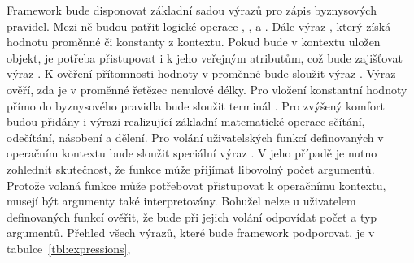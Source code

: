 Framework bude disponovat základní sadou výrazů pro zápis byznysových pravidel.
Mezi ně budou patřit logické operace , ,  a .
Dále výraz , který získá hodnotu proměnné či konstanty z kontextu.
Pokud bude v kontextu uložen objekt, je potřeba přistupovat i k jeho
veřejným atributům, což bude zajišťovat výraz .
K ověření přítomnosti hodnoty v proměnné bude sloužit výraz . Výraz  ověří,
zda je v proměnné řetězec nenulové délky. Pro vložení konstantní hodnoty přímo do byznysového pravidla bude
sloužit terminál . Pro zvýšený komfort budou přidány i výrazi realizující základní matematické operace sčítání, odečítání,
násobení a dělení. Pro volání uživatelských funkcí definovaných v operačním kontextu bude sloužit speciální výraz
. V jeho případě je nutno zohlednit skutečnost, že funkce může přijímat libovolný počet argumentů.
Protože volaná funkce může potřebovat přistupovat k operačnímu kontextu, musejí být argumenty také interpretovány.
Bohužel nelze u uživatelem definovaných funkcí ověřit, že bude při jejich volání odpovídat počet a typ argumentů.
Přehled všech výrazů, které bude framework podporovat, je v tabulce~\ref{tbl:expressions},

